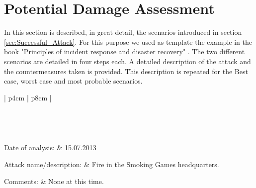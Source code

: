 \section{Potential Damage Assessment}

In this section is described, in great detail, the scenarios introduced in section \ref{sec:Successful_Attack}. For this purpose we used as template the example in the book "Principles of incident response and disaster recovery" \cite {whitman5}. The two different scenarios are detailed in four steps each. A detailed description of the attack and the countermeasures taken is provided. This description is repeated for the Best case, worst case and most probable scenarios.

\begin{longtable}{| p{4cm} | p{8cm} |}
	\hline {}\\\hline
	\endfirsthead
	
	\hline {}\\\hline
	\endhead
	
	\\\hline
	\endfoot
	
	\endlastfoot
	
	Date of analysis: & 15.07.2013 \\\hline
	
	Attack name/description: &  Fire in the Smoking Games headquarters.\\\hline
	
	Comments: & None at this time.\\\hline
	
	\\\hline
	
\end{longtable}
